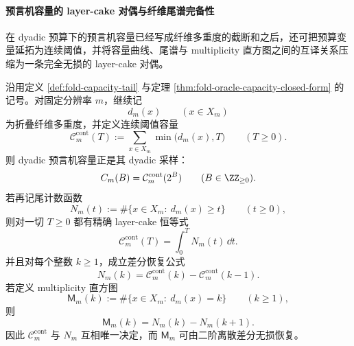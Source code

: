 \paragraph{预言机容量的 layer-cake 对偶与纤维尾谱完备性}
在 dyadic 预算下的预言机容量已经写成纤维多重度的截断和之后，还可把预算变量延拓为连续阈值，并将容量曲线、尾谱与 multiplicity 直方图之间的互译关系压缩为一条完全无损的 layer-cake 对偶。

\begin{theorem}\label{thm:xi-oracle-capacity-layercake-tail-completeness}
沿用定义 \ref{def:fold-capacity-tail} 与定理 \ref{thm:fold-oracle-capacity-closed-form} 的记号。对固定分辨率 \(m\)，继续记
\[
d_m(x)\qquad(x\in X_m)
\]
为折叠纤维多重度，并定义连续阈值容量
\[
\mathcal C_m^{\mathrm{cont}}(T)
:=
\sum_{x\in X_m}\min\bigl(d_m(x),T\bigr)
\qquad(T\ge 0).
\]
则 dyadic 预言机容量正是其 dyadic 采样：
\[
C_m(B)=\mathcal C_m^{\mathrm{cont}}(2^B)
\qquad(B\in\ZZ_{\ge 0}).
\]
若再记尾计数函数
\[
N_m(t):=\#\{x\in X_m:\ d_m(x)\ge t\}
\qquad(t\ge 0),
\]
则对一切 \(T\ge 0\) 都有精确 layer-cake 恒等式
\[
\mathcal C_m^{\mathrm{cont}}(T)=\int_0^T N_m(t)\,\dd t.
\]
并且对每个整数 \(k\ge 1\)，成立差分恢复公式
\[
N_m(k)=\mathcal C_m^{\mathrm{cont}}(k)-\mathcal C_m^{\mathrm{cont}}(k-1).
\]
若定义 multiplicity 直方图
\[
\mathsf M_m(k):=\#\{x\in X_m:\ d_m(x)=k\}
\qquad(k\ge 1),
\]
则
\[
\mathsf M_m(k)=N_m(k)-N_m(k+1).
\]
因此 \(\mathcal C_m^{\mathrm{cont}}\) 与 \(N_m\) 互相唯一决定，而 \(\mathsf M_m\) 可由二阶离散差分无损恢复。
\end{theorem}
